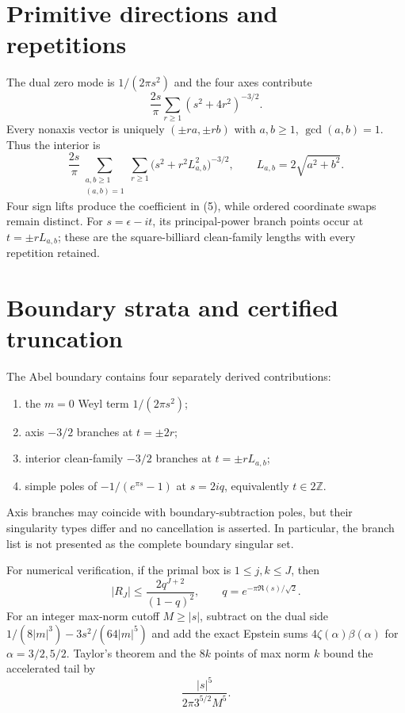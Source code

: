 \documentclass[10pt]{article}
\begin{document}
\section{Primitive directions and repetitions}
The dual zero mode is $1/(2\pi s^2)$ and the four axes contribute
\[
\frac{2s}{\pi}\sum_{r\ge1}(s^2+4r^2)^{-3/2}.                   \tag{4}
\]
Every nonaxis vector is uniquely
$(\pm ra,\pm rb)$ with $a,b\ge1$, $\gcd(a,b)=1$.  Thus the interior is
\begin{equation}
\frac{2s}{\pi}\sum_{\substack{a,b\ge1\\(a,b)=1}}\sum_{r\ge1}
\bigl(s^2+r^2L_{a,b}^2\bigr)^{-3/2},\qquad
L_{a,b}=2\sqrt{a^2+b^2}.                                      \tag{5}
\end{equation}
Four sign lifts produce the coefficient in (5), while ordered coordinate
swaps remain distinct.  For $s=\epsilon-it$, its principal-power branch points
occur at $t=\pm rL_{a,b}$; these are the square-billiard clean-family lengths
with every repetition retained.

\section{Boundary strata and certified truncation}
The Abel boundary contains four separately derived contributions:
\begin{enumerate}
\item the $m=0$ Weyl term $1/(2\pi s^2)$;
\item axis $-3/2$ branches at $t=\pm2r$;
\item interior clean-family $-3/2$ branches at $t=\pm rL_{a,b}$;
\item simple poles of $-1/(e^{\pi s}-1)$ at $s=2iq$, equivalently
      $t\in2\mathbb Z$.
\end{enumerate}
Axis branches may coincide with boundary-subtraction poles, but their
singularity types differ and no cancellation is asserted.  In particular,
the branch list is not presented as the complete boundary singular set.

For numerical verification, if the primal box is $1\le j,k\le J$, then
\[
|R_J|\le\frac{2q^{J+2}}{(1-q)^2},\qquad
q=e^{-\pi\Re(s)/\sqrt2}.                                      \tag{6}
\]
For an integer max-norm cutoff $M\ge |s|$, subtract on the dual side
$1/(8|m|^3)-3s^2/(64|m|^5)$ and add the exact Epstein sums
$4\zeta(\alpha)\beta(\alpha)$ for $\alpha=3/2,5/2$.  Taylor's theorem
and the $8k$ points of max norm $k$ bound the accelerated tail by
\[
\frac{|s|^5}{2\pi3^{5/2}M^5}.                                 \tag{7}
\]
\end{document}
